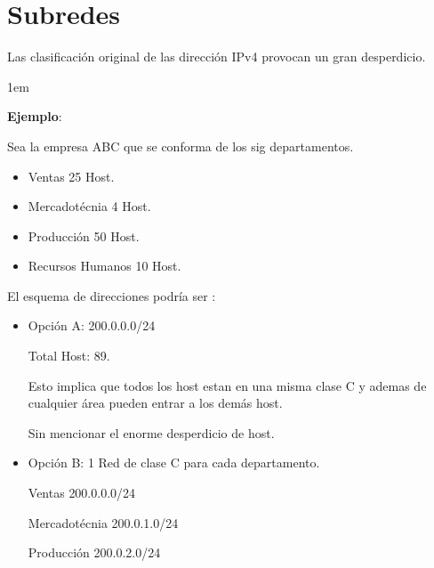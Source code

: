 \documentclass[12pt, fleqn]{report}                             %
\newenvironment{SmallIndentation}[1][0.75em]                    %
        {\begin{adjustwidth}{#1}{}\begin{footnotesize}}             %
        {\end{footnotesize}\end{adjustwidth}}                       %
\theoremstyle{break}                                            %
\newcommand{\Color}[2]{\textcolor{#1}{#2}}                      %
\begin{document}
        \clearpage
        \section{Subredes}

            Las clasificación original de las dirección IPv4 provocan un gran desperdicio.

            \begin{SmallIndentation}[1em]
                \textbf{Ejemplo}:
                
                Sea la empresa ABC que se conforma de los sig departamentos.

                \begin{itemize}
                    \item Ventas 25 Host.
                    \item Mercadotécnia 4 Host.
                    \item Producción 50 Host.
                    \item Recursos Humanos 10 Host.
                \end{itemize}

                El esquema de direcciones podría ser :

                \begin{itemize}
                    \item 
                        Opción A: \Color{Blue700MD}{200.0.0.0/24}

                        Total Host: 89.

                        Esto implica que todos los host estan en una misma clase
                        C y ademas de cualquier área pueden entrar a los demás host.

                        Sin mencionar el enorme desperdicio de host.

                    \item 
                        Opción B: 1 Red de clase C para cada departamento.

                        Ventas \Color{Blue700MD}{200.0.0.0/24}

                        Mercadotécnia \Color{Blue700MD}{200.0.1.0/24}

                        Producción \Color{Blue700MD}{200.0.2.0/24}


\end{itemize}
\end{SmallIndentation}
\end{document}
